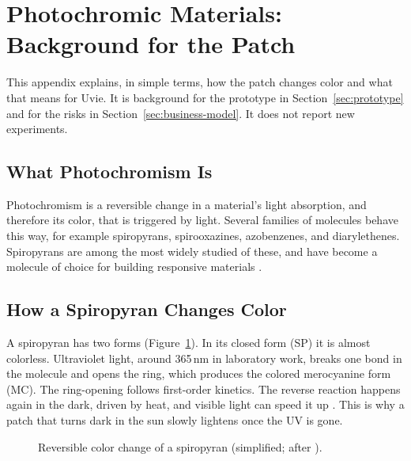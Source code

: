 \section{Photochromic Materials: Background for the Patch}\label{app:photochromic}

This appendix explains, in simple terms, how the patch changes color and what that means
for Uvie. It is background for the prototype in Section~\ref{sec:prototype} and for the risks in
Section~\ref{sec:business-model}. It does not report new experiments.

\subsection{What Photochromism Is}
Photochromism is a reversible change in a material's light absorption, and therefore its color,
that is triggered by light. Several families of molecules behave this way, for example
spiropyrans, spirooxazines, azobenzenes, and diarylethenes. Spiropyrans are among the most
widely studied of these, and have become a molecule of choice for building responsive materials
\cite{klajn2014}.

\subsection{How a Spiropyran Changes Color}
A spiropyran has two forms (Figure~\ref{fig:photochromic}). In its closed form (SP) it is almost
colorless. Ultraviolet light, around 365\,nm in laboratory work, breaks one bond in the molecule and
opens the ring, which produces the colored merocyanine form (MC). The ring-opening follows
first-order kinetics. The reverse reaction happens again in the dark, driven by heat, and visible light
can speed it up \cite{klajn2014}. This is why a patch that turns dark in the sun slowly lightens
once the UV is gone.

\begin{figure}[ht]
  \centering
  \caption{Reversible color change of a spiropyran (simplified; after \cite{klajn2014}).}
  \label{fig:photochromic}
\end{figure}

